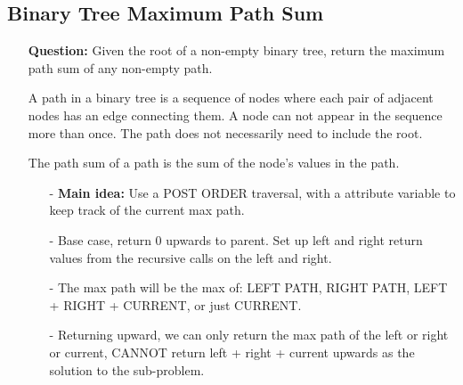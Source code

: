 \documentclass[12pt]{article}
\begin{document}
\subsection{Binary Tree Maximum Path Sum}
\begin{enumerate}
  \item[] \textbf{Question:} Given the root of a non-empty binary tree, return the maximum path sum of any non-empty path.

A path in a binary tree is a sequence of nodes where each pair of adjacent nodes has an edge connecting them. A node can not appear in the sequence more than once. The path does not necessarily need to include the root.

The path sum of a path is the sum of the node's values in the path.


    \begin{enumerate}
      \item[-] \textbf{Main idea:} Use a POST ORDER traversal, with a attribute variable to keep track of the current max path.
      \item[-] Base case, return 0 upwards to parent. Set up left and right return values from the recursive calls on the left and right.
      \item[-] The max path will be the max of: LEFT PATH, RIGHT PATH, LEFT + RIGHT + CURRENT, or just CURRENT.
    \item[-] Returning upward, we can only return the max path of the left or right or current, CANNOT return left + right + current upwards as the solution to the sub-problem.
    \end{enumerate}
\end{enumerate}
\end{document}
